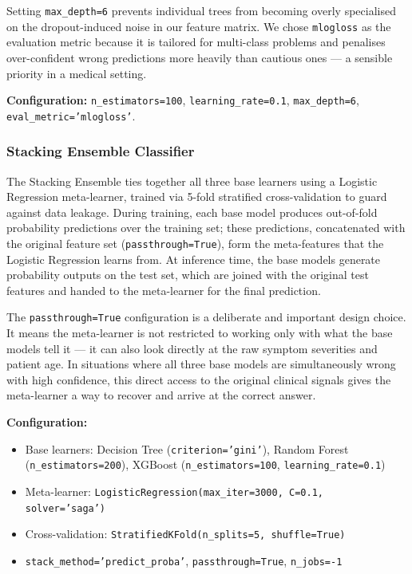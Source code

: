 \documentclass[12pt,a4paper]{article}
\begin{document}
Setting \texttt{max\_depth=6} prevents individual trees from becoming overly specialised on the dropout-induced noise in our feature matrix. We chose \texttt{mlogloss} as the evaluation metric because it is tailored for multi-class problems and penalises over-confident wrong predictions more heavily than cautious ones --- a sensible priority in a medical setting.

\textbf{Configuration:} \texttt{n\_estimators=100}, \texttt{learning\_rate=0.1}, \texttt{max\_depth=6}, \newline \texttt{eval\_metric='mlogloss'}.

\subsubsection{Stacking Ensemble Classifier}
The Stacking Ensemble ties together all three base learners using a Logistic Regression meta-learner, trained via 5-fold stratified cross-validation to guard against data leakage. During training, each base model produces out-of-fold probability predictions over the training set; these predictions, concatenated with the original feature set (\texttt{passthrough=True}), form the meta-features that the Logistic Regression learns from. At inference time, the base models generate probability outputs on the test set, which are joined with the original test features and handed to the meta-learner for the final prediction.

The \texttt{passthrough=True} configuration is a deliberate and important design choice. It means the meta-learner is not restricted to working only with what the base models tell it --- it can also look directly at the raw symptom severities and patient age. In situations where all three base models are simultaneously wrong with high confidence, this direct access to the original clinical signals gives the meta-learner a way to recover and arrive at the correct answer.

\textbf{Configuration:}
\begin{itemize}
    \item Base learners: Decision Tree (\texttt{criterion='gini'}), Random Forest (\texttt{n\_estimators=200}), XGBoost (\texttt{n\_estimators=100}, \texttt{learning\_rate=0.1})
    \item Meta-learner: \texttt{LogisticRegression(max\_iter=3000, C=0.1, solver='saga')}
    \item Cross-validation: \texttt{StratifiedKFold(n\_splits=5, shuffle=True)}
    \item \texttt{stack\_method='predict\_proba'}, \texttt{passthrough=True}, \texttt{n\_jobs=-1}
\end{itemize}
\end{document}
